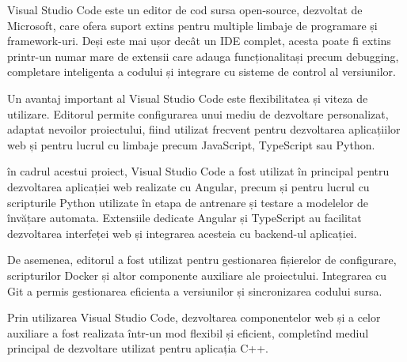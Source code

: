 Visual Studio Code este un editor de cod sursa open-source, dezvoltat de Microsoft, care ofera suport extins pentru multiple limbaje de programare și framework-uri. Deși este mai ușor decât un IDE complet, acesta poate fi extins printr-un numar mare de extensii care adauga funcționalitași precum debugging, completare inteligenta a codului și integrare cu sisteme de control al versiunilor.

Un avantaj important al Visual Studio Code este flexibilitatea și viteza de utilizare. Editorul permite configurarea unui mediu de dezvoltare personalizat, adaptat nevoilor proiectului, fiind utilizat frecvent pentru dezvoltarea aplicațiilor web și pentru lucrul cu limbaje precum JavaScript, TypeScript sau Python.

în cadrul acestui proiect, Visual Studio Code a fost utilizat în principal pentru dezvoltarea aplicației web realizate cu Angular, precum și pentru lucrul cu scripturile Python utilizate în etapa de antrenare și testare a modelelor de învățare automata. Extensiile dedicate Angular și TypeScript au facilitat dezvoltarea interfeței web și integrarea acesteia cu backend-ul aplicației.

De asemenea, editorul a fost utilizat pentru gestionarea fișierelor de configurare, scripturilor Docker și altor componente auxiliare ale proiectului. Integrarea cu Git a permis gestionarea eficienta a versiunilor și sincronizarea codului sursa.

Prin utilizarea Visual Studio Code, dezvoltarea componentelor web și a celor auxiliare a fost realizata într-un mod flexibil și eficient, completînd mediul principal de dezvoltare utilizat pentru aplicația C++.
